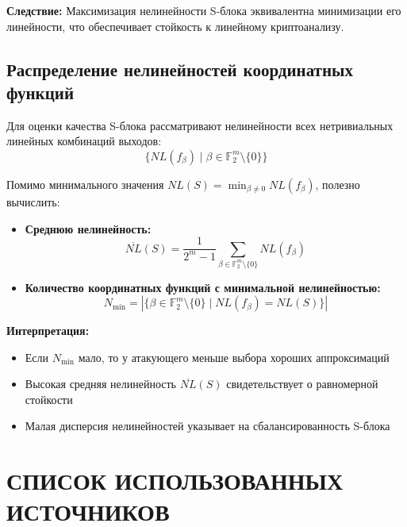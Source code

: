 \textbf{Следствие:} Максимизация нелинейности S-блока эквивалентна минимизации его линейности, что обеспечивает стойкость к линейному криптоанализу.


\subsection{Распределение нелинейностей координатных функций}

Для оценки качества S-блока рассматривают нелинейности всех нетривиальных линейных комбинаций выходов:
\[
    \{NL(f_\beta) \mid \beta \in \mathbb{F}_2^m \setminus \{0\}\}
\]

Помимо минимального значения $NL(S) = \min_{\beta \neq 0} NL(f_\beta)$, 
полезно вычислить:

\begin{itemize}
    \item \textbf{Среднюю нелинейность:}
    \[
        \overline{NL}(S) = \frac{1}{2^m - 1} \sum_{\beta \in \mathbb{F}_2^m \setminus \{0\}} NL(f_\beta)
    \]
    
    \item \textbf{Количество координатных функций с минимальной нелинейностью:}
    \[
        N_{\min} = |\{\beta \in \mathbb{F}_2^m \setminus \{0\} \mid NL(f_\beta) = NL(S)\}|
    \]
\end{itemize}

\textbf{Интерпретация:} 
\begin{itemize}
    \item Если $N_{\min}$ мало, то у атакующего меньше выбора хороших аппроксимаций
    \item Высокая средняя нелинейность $\overline{NL}(S)$ свидетельствует о равномерной стойкости
    \item Малая дисперсия нелинейностей указывает на сбалансированность S-блока
\end{itemize}
\newpage 
\section*{СПИСОК ИСПОЛЬЗОВАННЫХ ИСТОЧНИКОВ}
\renewcommand{\refname}{\vspace*{-3em}}  %

